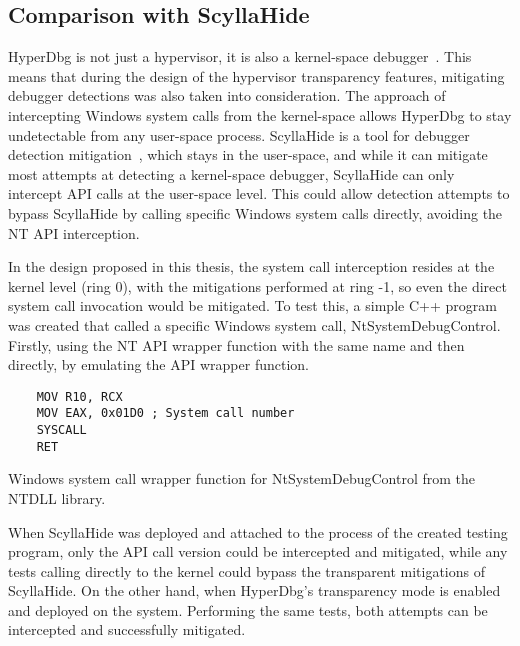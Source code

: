 \subsection{Comparison with ScyllaHide}\label{scyllahide-comparison}
HyperDbg is not just a hypervisor, it is also a kernel-space debugger~\cite{karvandi2022hyperdbg}. This means that during the design of 
the hypervisor transparency features, mitigating debugger detections was also taken into consideration. The approach of intercepting Windows system calls 
from the kernel-space allows HyperDbg to stay undetectable from any user-space process. ScyllaHide is a tool for debugger detection mitigation~\cite{scyllahide}, 
which stays in the user-space, and while it can mitigate most attempts at detecting a kernel-space debugger, ScyllaHide can only intercept API calls at the user-space level. 
This could allow detection attempts to bypass ScyllaHide by calling specific Windows system calls directly, avoiding the NT API interception. 

In the design proposed in this thesis, the system call interception resides at the kernel level (ring 0), with the mitigations performed at ring -1, 
so even the direct system call invocation would be mitigated. To test this, a simple C++ program was created that called a specific Windows system call, 
NtSystemDebugControl. Firstly, using the NT API wrapper function with the same name and then directly, by emulating the API wrapper function.
\begin{listing}[!ht]

\begin{verbatim}
    MOV R10, RCX
    MOV EAX, 0x01D0 ; System call number
    SYSCALL
    RET
\end{verbatim}
\caption{Windows system call wrapper function for NtSystemDebugControl from the NTDLL library.}
\label{lst:syscall-wrapper}
\end{listing}
When ScyllaHide was deployed and attached to the process of the created testing program, only the API call version could be intercepted and mitigated, 
while any tests calling directly to the kernel could bypass the transparent mitigations of ScyllaHide.
On the other hand, when HyperDbg's transparency mode is enabled and deployed on the system. Performing the same tests, both attempts can be intercepted and 
successfully mitigated.



